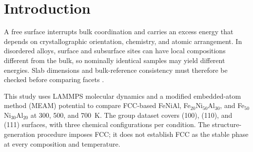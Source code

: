 \section{Introduction}
A free surface interrupts bulk coordination and carries an excess energy that depends on crystallographic orientation, chemistry, and atomic arrangement. In disordered alloys, surface and subsurface sites can have local compositions different from the bulk, so nominally identical samples may yield different energies. Slab dimensions and bulk-reference consistency must therefore be checked before comparing facets \cite{sun2013slabs,yalcin2024surfflow}.

This study uses LAMMPS molecular dynamics and a modified embedded-atom method (MEAM) potential to compare FCC-based FeNiAl, Fe$_{20}$Ni$_{50}$Al$_{30}$, and Fe$_{50}$Ni$_{30}$Al$_{20}$ at 300, 500, and 700~K. The group dataset covers (100), (110), and (111) surfaces, with three chemical configurations per condition. The structure-generation procedure imposes FCC; it does not establish FCC as the stable phase at every composition and temperature.
